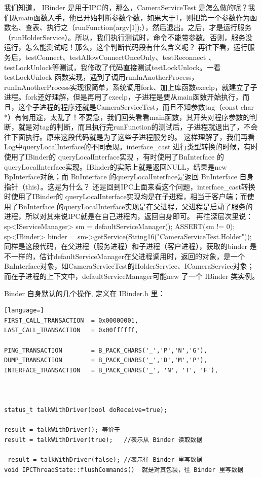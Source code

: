 \documentclass[a4paper,11pt]{article}
\begin{document}
我们知道， IBinder 是用于IPC的，那么，CameraServiceTest 是怎么做的呢？我们从main函数入手，他已开始判断参数个数，如果大于1，则把第一个参数作为函数名、查表、执行之（runFunction(argv[1]);），然后退出。之后，才是运行服务 （runHolderService）。所以，我们执行测试时，命令不能带参数。否则，服务没运行，怎么能测试呢！那么，这个判断代码段有什么含义呢？
再往下看，运行服务后，testConnect、testAllowConnectOnceOnly、testReconnect 、testLockUnlock等测试，我修改了代码直接测试testLockUnlock。一看testLockUnlock 函数实现，遇到了调用runInAnotherProcess，runInAnotherProcess实现很简单，系统调用fork、加上库函数execlp，就建立了子进程。fork还好理解，但是再用了execlp，子进程是要从main函数开始执行，而且，这个子进程的程序还就是CameraServiceTest，而且不知参数tag（const char *）有何用途，太乱了！不要急，我们回头看看main函数，其开头对程序参数的判断，就是对tag的判断，而且执行完runFunction的测试后，子进程就退出了，不会往下面执行。原来这段代码就是为了这些子进程服务的。
这样理解了，我们再看Log中queryLocalInterface的不同表现。interface_cast 进行类型转换的时候，有时使用了IBinder的 queryLocalInterface实现 ，有时使用了BnInterface 的queryLocalInterface实现。IBinder的实际上就是返回NULL，结果是new BpInterface对象；而
BnInterface 的queryLocalInterface是返回 BnInterface 自身指针（this）。这是为什么？ 还是回到IPC上面来看这个问题，interface_cast转换时使用了IBinder的 queryLocalInterface实现均是在子进程，相当于客户端；而使用了BnInterface 的queryLocalInterface实现是在父进程，父进程是启动了服务的进程，所以对其来说IPC就是在自己进程内，返回自身即可。
再往深层次里说：
    sp<IServiceManager> sm = defaultServiceManager();
    ASSERT(sm != 0);
    sp<IBinder> binder = sm->getService(String16("CameraServiceTest.Holder"));
同样是这段代码，在父进程（服务进程）和子进程（客户进程），获取的binder 是不一样的，估计defaultServiceManager在父进程调用时，返回的对象，是一个 BnInterface对象，如CameraServiceTest的HolderService、ICameraService对象；而在子进程的上下文中，defaultServiceManager可能new 了一个 IBinder 类实例。






Binder 自身默认的几个操作, 定义在 IBinder.h 里：
\begin{lstlisting}[language=]
FIRST_CALL_TRANSACTION  = 0x00000001,
LAST_CALL_TRANSACTION   = 0x00ffffff,

PING_TRANSACTION        = B_PACK_CHARS('_','P','N','G'),
DUMP_TRANSACTION        = B_PACK_CHARS('_','D','M','P'),
INTERFACE_TRANSACTION   = B_PACK_CHARS('_', 'N', 'T', 'F'),



status_t talkWithDriver(bool doReceive=true);

result = talkWithDriver(); 等价于
result = talkWithDriver(true);   //表示从 Binder 读取数据

 result = talkWithDriver(false); //表示往 Binder 里写数据
void IPCThreadState::flushCommands()  就是对其包装，往 Binder 里写数据
\end{lstlisting}
\end{document}
